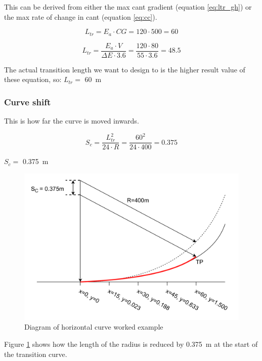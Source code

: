 \documentclass{bcrre_exam}
\begin{document}
This can be derived from either the max cant gradient (equation \ref{eq:ltr_gh}) or the max rate of change in cant (equation \ref{eq:cc}).

\begin{equation}
    \label{eq:ltr_gh}
    L_{tr} = E_a \cdot CG = 120 \cdot 500 = 60
\end{equation}

\begin{equation}
    \label{eq:cc}
    L_{tr} = \frac{E_a \cdot V}{\Delta E \cdot 3.6} = \frac{120 \cdot 80}{55 \cdot 3.6} = 48.5
\end{equation}

The actual transition length we want to design to is the higher result value of these equation, so: $L_{tr}=$ \qty{60}{m} 

\subsubsection*{Curve shift}

This is how far the curve is moved inwards.

\begin{equation}
    S_c=\frac{L_{tr}^2}{24 \cdot R} = \frac{60^2}{24 \cdot 400} = 0.375
\end{equation}

$S_c=$ \qty{0.375}{m}

\begin{figure}[h]
    \centering
    \includegraphics[width=0.9\linewidth]{images/track-alignment-worksheet-vertical-curve.drawio.pdf}
    \caption{Diagram of horizontal curve worked example}
    \label{fig:hoz-cur-example}
\end{figure}

Figure \ref{fig:hoz-cur-example} shows how the length of the radius is reduced by \qty{0.375}{m} at the start of the transition curve.
\end{document}
